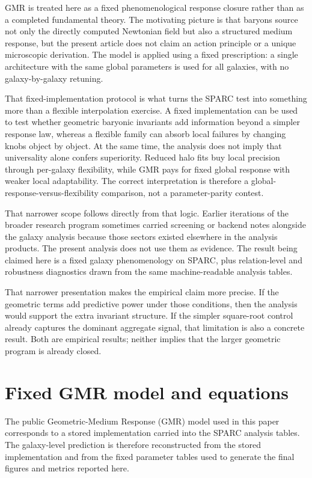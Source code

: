 ﻿\documentclass[twocolumn,linenumbers]{aastex701}
\begin{document}
GMR is treated here as a fixed phenomenological response closure rather than as a completed fundamental theory. The motivating picture is that baryons source not only the directly computed Newtonian field but also a structured medium response, but the present article does not claim an action principle or a unique microscopic derivation. The model is applied using a fixed prescription: a single architecture with the same global parameters is used for all galaxies, with no galaxy-by-galaxy retuning.

That fixed-implementation protocol is what turns the SPARC test into something more than a flexible interpolation exercise. A fixed implementation can be used to test whether geometric baryonic invariants add information beyond a simpler response law, whereas a flexible family can absorb local failures by changing knobs object by object. At the same time, the analysis does not imply that universality alone confers superiority. Reduced halo fits buy local precision through per-galaxy flexibility, while GMR pays for fixed global response with weaker local adaptability. The correct interpretation is therefore a global-response-versus-flexibility comparison, not a parameter-parity contest.

That narrower scope follows directly from that logic. Earlier iterations of the broader research program sometimes carried screening or backend notes alongside the galaxy analysis because those sectors existed elsewhere in the analysis products. The present analysis does not use them as evidence. The result being claimed here is a fixed galaxy phenomenology on SPARC, plus relation-level and robustness diagnostics drawn from the same machine-readable analysis tables.

That narrower presentation makes the empirical claim more precise. If the geometric terms add predictive power under those conditions, then the analysis would support the extra invariant structure. If the simpler square-root control already captures the dominant aggregate signal, that limitation is also a concrete result. Both are empirical results; neither implies that the larger geometric program is already closed.
\section{Fixed GMR model and equations}

The public Geometric-Medium Response (GMR) model used in this paper corresponds to a stored implementation carried into the SPARC analysis tables. The galaxy-level prediction is therefore reconstructed from the stored implementation and from the fixed parameter tables used to generate the final figures and metrics reported here.
\end{document}

